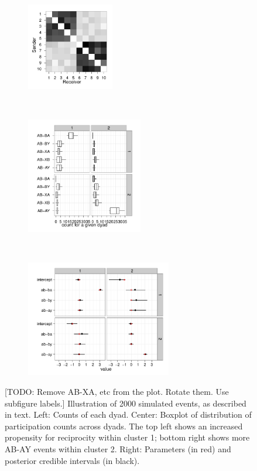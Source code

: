 \begin{figure}
\begin{subfigure}[b]{0.25\textwidth}
\centering
\includegraphics[width=1.5in]{../figs/synthetic/mat.pdf}
\end{subfigure}
~
\begin{subfigure}[b]{0.3\textwidth}
\centering
\includegraphics[width=2in]{../figs/synthetic/counts.pdf}
\end{subfigure}
~
\begin{subfigure}[b]{0.3\textwidth}
\centering
\includegraphics[width=2.5in]{../figs/synthetic/params-estimates.pdf}
\end{subfigure}
\caption{[TODO: Remove AB-XA, etc from the plot. Rotate them. Use subfigure labels.] Illustration of 2000 simulated events, as described in text. Left: Counts of each dyad. Center: Boxplot of distribution of participation counts across dyads.  The top left shows an increased propensity for reciprocity within cluster 1; bottom right shows more AB-AY events within cluster 2.  Right: Parameters (in red) and posterior credible intervals (in black).}
\label{fig:syncounts}
\end{figure}

